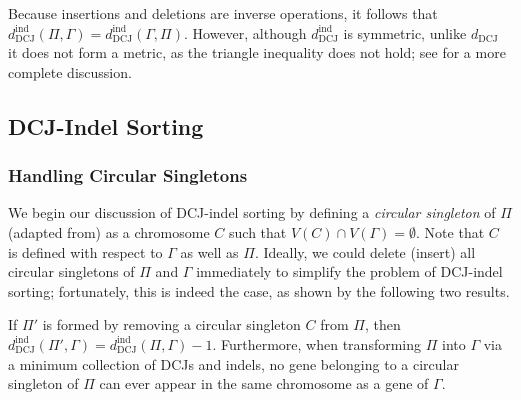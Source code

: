 Because insertions and deletions are inverse operations, it follows that $d_{\mathrm{DCJ}}^{\mathrm{ind}}(\Pi, \Gamma) = d_{\mathrm{DCJ}}^{\mathrm{ind}}(\Gamma, \Pi)$.  However, although $d_{\mathrm{DCJ}}^{\mathrm{ind}}$ is symmetric, unlike $d_{\mathrm{DCJ}}$ it does not form a metric, as the triangle inequality does not hold; see \cite{stoye_triangle} for a more complete discussion.

\subsection*{DCJ-Indel Sorting} \label{Section: Computing DCJ-Indel Distance}
\subsubsection*{Handling Circular Singletons}

We begin our discussion of DCJ-indel sorting by defining a {\em circular singleton} of $\Pi$ (adapted from\cite{braga2010}) as a chromosome $C$ such that $V(C) \cap V(\Gamma) = \emptyset$.  Note that $C$ is defined with respect to $\Gamma$ as well as $\Pi$.  Ideally, we could delete (insert) all circular singletons of $\Pi$ and $\Gamma$ immediately to simplify the problem of DCJ-indel sorting; fortunately, this is indeed the case, as shown by the following two results.

\begin{proposition}
If $\Pi'$ is formed by removing a circular singleton $C$ from $\Pi$, then $d_{\mathrm{DCJ}}^{\mathrm{ind}}(\Pi', \Gamma) = d_{\mathrm{DCJ}}^{\mathrm{ind}}(\Pi, \Gamma) - 1$.  Furthermore, when transforming $\Pi$ into $\Gamma$ via a minimum collection of DCJs and indels, no gene belonging to a circular singleton of $\Pi$ can ever appear in the same chromosome as a gene of $\Gamma$.
\label{Proposition: Circular Singleton}
\end{proposition}

